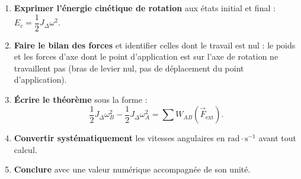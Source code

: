 \documentclass[11pt]{article}
\begin{document}
\begin{methode}
\begin{enumerate}
\item \textbf{Exprimer l'énergie cinétique de rotation} aux états initial et final : $E_c = \dfrac{1}{2}J_{\Delta}\omega^2$.
\item \textbf{Faire le bilan des forces} et identifier celles dont le travail est nul : le poids et les forces d'axe dont le point d'application est sur l'axe de rotation ne travaillent pas (bras de levier nul, pas de déplacement du point d'application).
\item \textbf{Écrire le théorème} sous la forme :
      \[ \frac{1}{2}J_{\Delta}\omega_B^2 - \frac{1}{2}J_{\Delta}\omega_A^2 = \sum W_{AB}(\vec{F}_{\mathrm{ext}}). \]
\item \textbf{Convertir systématiquement} les vitesses angulaires en $\mathrm{rad\cdot s^{-1}}$ avant tout calcul.
\item \textbf{Conclure} avec une valeur numérique accompagnée de son unité.
\end{enumerate}
\end{methode}
\end{document}
